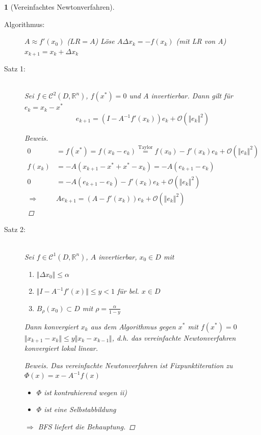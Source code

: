 \documentclass[12pt]{article}
\theoremstyle{break}
\newtheorem{nothing}[theorem]{}
\begin{document}
\begin{nothing}[Vereinfachtes Newtonverfahren] \leavevmode
\begin{description}
  \item[Algorithmus:]\leavevmode
  \begin{algorithmic}
  \STATE $A \approx f'(x_0)$ ($LR = A$)
    \STATE Löse $A \Delta x_k = -f(x_k)$ (mit LR von A)
    \STATE $x_{k+1} = x_k + \Delta x_k$
  \ENDFOR
  \end{algorithmic}
  
  \item[Satz 1:]\leavevmode\\
  Sei $f \in \mathcal{C}^2(D, \mathbb{R}^n)$, $f(x^*) = 0$ und $A$ invertierbar. Dann gilt für $e_k = x_k - x^*$
  $$e_{k+1} = (I-A^{-1}f'(x_k)) e_k + \mathcal{O}( \Vert e_k \Vert^2)$$
  \begin{proof}[Beweis]
  \begin{align*}
  0 &= f(x^*) = f(x_k-e_k) \overset{\text{Taylor}}{=} f(x_0) - f'(x_k)e_k + \mathcal{O}(\Vert e_k \Vert^2) &\\
  f(x_k) &= -A( x_{k+1} - x^* + x^* - x_k) = -A(e_{k+1} - e_k) &\\
  0 &= -A(e_{k+1} - e_k) - f'(x_k)e_k + \mathcal{O}(\Vert e_k \Vert^2) &\\
  \Rightarrow \medspace &Ae_{k+1} = (A-f'(x_k))e_k + \mathcal{O}(\Vert e_k \Vert^2)
  \end{align*}
  \end{proof}
  
  \item[Satz 2:] \leavevmode \\
  Sei $f \in \mathcal{C}^1(D, \mathbb{R}^n)$, $A$ invertierbar, $x_0 \in D$ mit 
  \renewcommand{\labelenumi}{\roman{enumi})}
  \begin{enumerate}
    \item $\Vert \Delta x_0 \Vert \leq \alpha$
    \item $\Vert I - A^{-1}f'(x) \Vert \leq y < 1$ für bel. $x \in D$
    \item $B_{\rho}(x_0) \subset D$ mit $\rho = \frac{\alpha}{1-y}$
  \end{enumerate}
  Dann konvergiert $x_k$ aus dem Algorithmus gegen $x^*$ mit $f(x^*) = 0$ $\Vert x_{k+1} -x_k \Vert \leq y \Vert x_k - x_{k-1} \Vert$, d.h. das vereinfachte Newtonverfahren konvergiert lokal linear.
  \begin{proof}[Beweis]
  Das vereinfachte Newtonverfahren ist Fixpunktiteration zu $\Phi(x) = x-A^{-1}f(x)$
  \begin{itemize}
    \item $\Phi$ ist kontrahierend wegen ii)
    \item $\Phi$ ist eine Selbstabbildung
  \end{itemize}
  $\Rightarrow$ BFS liefert die Behauptung.
  \end{proof}
\end{description}
\end{nothing}
\end{document}
